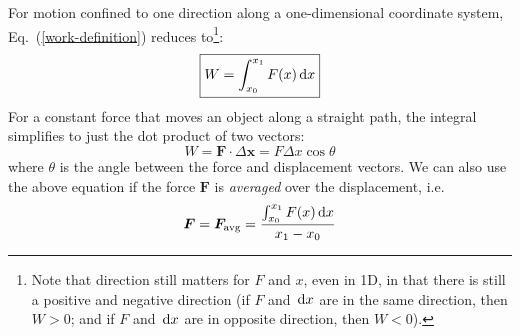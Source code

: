 For motion confined to one direction along a one-dimensional coordinate
system, Eq.~(\ref{work-definition}) reduces to\footnote{Note that direction
still matters for $F$ and $x$, even in 1D, in that there is still a positive
and negative direction (if $F$ and $\dl x$ are in the same direction, then
$W>0$; and if $F$ and $\dl x$ are in opposite direction, then $W<0$).}:
\begin{equation}
  \boxed{
    W=\int_{x_0}^{x_1} F(x)\dl x
  }
\end{equation}
For a constant force that moves an object along a straight path, the integral
simplifies to just the dot product of two vectors:
\begin{equation}
  \boxed{
    W = \bm F\cdot\Delta\bm x=F\Delta x\cos\theta
  }
  \label{eq:no-integration}
\end{equation}
where $\theta$ is the angle between the force and displacement vectors. We can
also use the above equation if the force $\bm F$ is \emph{averaged} over
the displacement, i.e.\
\begin{equation}
  \bm F=\bm F_\text{avg}=\frac{\int_{x_0}^{x_1} F(x)\dl x}{x_1-x_0}
\end{equation}
